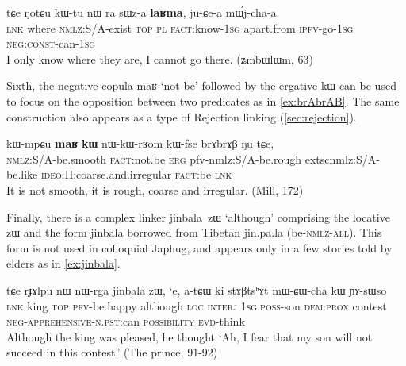 \documentclass[oldfontcommands,oneside,a4paper,11pt]{article}
\newcommand{\ipa}[1]{{\phon \mbox{#1}}} %
\begin{document}
 \begin{exe}
\ex \label{ex:sWza.laRma}
\gll
 \ipa{tɕe}  	\ipa{ŋotɕu}  	\ipa{kɯ-tu}  	\ipa{nɯ} \ipa{ra}  	\ipa{sɯz-a}  	\ipa{\textbf{laʁma},}  	\ipa{ju-ɕe-a}  	\ipa{mɯ́j-cha-a.}  	\\
 \textsc{lnk} where \textsc{nmlz}:S/A-exist \textsc{top} \textsc{pl} \textsc{fact}:know-\textsc{1sg} apart.from \textsc{ipfv}-go-\textsc{1sg} \textsc{neg:const}-can-\textsc{1sg}\\
\glt I only know where they are, I cannot go there. (ʑmbɯlɯm, 63)
\end{exe}
Sixth, the negative copula \ipa{maʁ}  `not be' followed by the ergative \ipa{kɯ} can be used to focus on the opposition between two predicates as in \ref{ex:brAbrAB}. The same construction also appears as a type of Rejection linking (\ref{sec:rejection}).
\begin{exe}
\ex \label{ex:brAbrAB}
\gll
\ipa{kɯ-mpɕu}  	\ipa{\textbf{maʁ}}  	\ipa{\textbf{kɯ}}  	\ipa{nɯ-kɯ-rʁom}  	\ipa{kɯ-fse}  	\ipa{brɤbrɤβ}  	\ipa{ŋu}  	\ipa{tɕe,}  \\
\textsc{nmlz:S/A}-be.smooth \textsc{fact}:not.be \textsc{erg}   {pfv-nmlz:S/A}-be.rough extsc{nmlz:S/A}-be.like \textsc{ideo}:II:coarse.and.irregular \textsc{fact}:be  \textsc{lnk} \\
\glt It is not smooth, it is rough, coarse and irregular. (Mill, 172)
\end{exe}

Finally, there is a complex linker \ipa{jinbala zɯ} `although' comprising the locative \ipa{zɯ} and the form \ipa{jinbala} borrowed from Tibetan \ipa{jin.pa.la} (be-\textsc{nmlz-all}). This form is not used in colloquial Japhug, and appears only in a few stories told by elders as in \ref{ex:jinbala}.

\begin{exe}
\ex \label{ex:jinbala}
\gll 
\ipa{tɕe}  	\ipa{rɟɤlpu}  	\ipa{nɯ}  	\ipa{nɯ-rga}  	\ipa{jinbala}  	\ipa{zɯ,}  	\ipa{`e,}  	\ipa{a-tɕɯ}  	\ipa{ki}  	\ipa{stɤβtsʰɤt}  	\ipa{mɯ-ɕɯ-cha}  	\ipa{kɯ}  	\ipa{ɲɤ-sɯso}  \\
\textsc{lnk} king \textsc{top} \textsc{pfv}-be.happy although \textsc{loc} \textsc{interj} \textsc{1sg.poss}-son \textsc{dem:prox} contest \textsc{neg-apprehensive-n.pst}:can \textsc{possibility} \textsc{evd}-think \\
\glt Although the king was pleased, he thought `Ah, I fear that my son will not succeed in this contest.' (The prince, 91-92)
 \end{exe}
\end{document}
